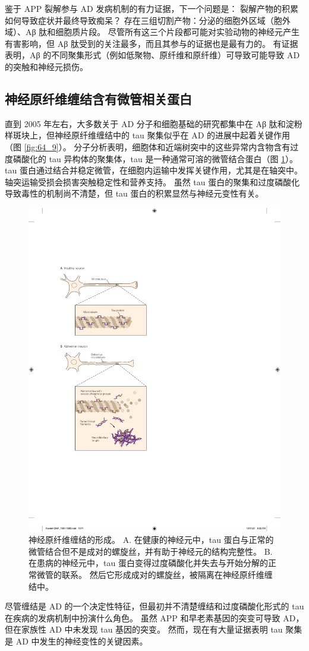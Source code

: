 鉴于 APP 裂解参与 AD 发病机制的有力证据，下一个问题是：
裂解产物的积累如何导致症状并最终导致痴呆？ 存在三组切割产物：分泌的细胞外区域（胞外域）、Aβ 肽和细胞质片段。
尽管所有这三个片段都可能对实验动物的神经元产生有害影响，但 Aβ 肽受到的关注最多，而且其参与的证据也是最有力的。
有证据表明，Aβ 的不同聚集形式（例如低聚物、原纤维和原纤维）可导致可能导致 AD 的突触和神经元损伤。



\subsection{神经原纤维缠结含有微管相关蛋白}
直到 2005 年左右，大多数关于 AD 分子和细胞基础的研究都集中在 Aβ 肽和淀粉样斑块上，但神经原纤维缠结中的 tau 聚集似乎在 AD 的进展中起着关键作用（图 \ref{fig:64_9}）。 分子分析表明，细胞体和近端树突中的这些异常内含物含有过度磷酸化的 tau 异构体的聚集体，tau 是一种通常可溶的微管结合蛋白（图 \ref{fig:64_13}）。 tau 蛋白通过结合并稳定微管，在细胞内运输中发挥关键作用，尤其是在轴突中。 轴突运输受损会损害突触稳定性和营养支持。 虽然 tau 蛋白的聚集和过度磷酸化导致毒性的机制尚不清楚，但 tau 蛋白的积累显然与神经元变性有关。

\begin{figure}[htbp]
	\centering
	\includegraphics[width=0.5\linewidth]{chap64/fig_64_13}
	\caption{神经原纤维缠结的形成。 A. 在健康的神经元中，tau 蛋白与正常的微管结合但不是成对的螺旋丝，并有助于神经元的结构完整性。 B. 在患病的神经元中，tau 蛋白变得过度磷酸化并失去与开始分解的正常微管的联系。 然后它形成成对的螺旋丝，被隔离在神经原纤维缠结中。}
	\label{fig:64_13}
\end{figure}

尽管缠结是 AD 的一个决定性特征，但最初并不清楚缠结和过度磷酸化形式的 tau 在疾病的发病机制中扮演什么角色。 虽然 APP 和早老素基因的突变可导致 AD，但在家族性 AD 中未发现 tau 基因的突变。 然而，现在有大量证据表明 tau 聚集是 AD 中发生的神经变性的关键因素。

